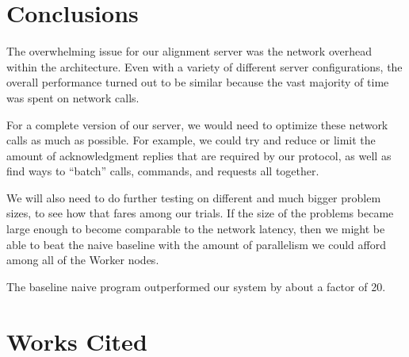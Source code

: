 \documentclass[12pt]{article}
\begin{document}
\section{Conclusions} 

The overwhelming issue for our alignment server was the network overhead within the architecture. Even with a variety of different server configurations, the overall performance turned out to be similar because the vast majority of time was spent on network calls. 

For a complete version of our server, we would need to optimize these network calls as much as possible. For example, we could try and reduce or limit the amount of acknowledgment replies that are required by our protocol, as well as find ways to ``batch'' calls, commands, and requests all together.

We will also need to do further testing on different and much bigger problem sizes, to see how that fares among our trials. If the size of the problems became large enough to become comparable to the network latency, then we might be able to beat the naive baseline with the amount of parallelism we could afford among all of the Worker nodes.

The baseline naive program outperformed our system by about a factor of 20.


\section{Works Cited}
\end{document}
